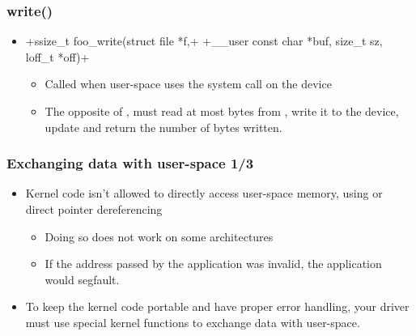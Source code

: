 \begin{frame}[fragile]
  \frametitle{write()}
  \begin{itemize}
  \item {}+ssize_t foo_write(struct file *f,+
    +__user const char *buf, size_t sz, loff_t *off)+
    \begin{itemize}
    \item Called when user-space uses the  system call
      on the device
    \item The opposite of , must read at most 
      bytes from , write it to the device, update 
      and return the number of bytes written.
    \end{itemize}
  \end{itemize}
\end{frame}

\begin{frame}
  \frametitle{Exchanging data with user-space 1/3}
  \begin{itemize}
  \item Kernel code isn't allowed to directly access user-space
    memory, using  or direct pointer dereferencing
    \begin{itemize}
    \item Doing so does not work on some architectures
    \item If the address passed by the application was invalid, the
      application would segfault.
    \end{itemize}
  \item To keep the kernel code portable and have proper error
    handling, your driver must use special kernel functions to
    exchange data with user-space.
  \end{itemize}
\end{frame}

